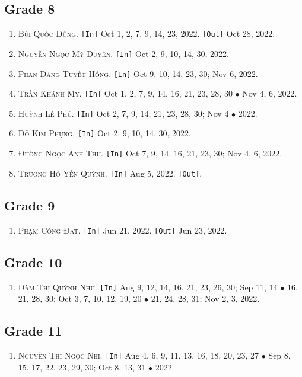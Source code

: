 \documentclass{article}
\numberwithin{equation}{section}
\begin{document}
\subsection{Grade 8}
\begin{enumerate}
	\item \textsc{Bùi Quốc Dũng.} \texttt{[In]} Oct 1, 2, 7, 9, 14, 23, 2022. \texttt{[Out]} Oct 28, 2022.
	\item \textsc{Nguyễn Ngọc Mỹ Duyên.} \texttt{[In]} Oct 2, 9, 10, 14, 30, 2022.
	\item \textsc{Phan Đặng Tuyết Hồng.} \texttt{[In]} Oct 9, 10, 14, 23, 30; Nov 6, 2022.
	\item \textsc{Trần Khánh My.} \texttt{[In]} Oct 1, 2, 7, 9, 14, 16, 21, 23, 28, 30 $\bullet$ Nov 4, 6, 2022.
	\item \textsc{Huỳnh Lê Phú.} \texttt{[In]} Oct 2, 7, 9, 14, 21, 23, 28, 30; Nov 4 $\bullet$ 2022.
	\item \textsc{Đỗ Kim Phụng.} \texttt{[In]} Oct 2, 9, 10, 14, 30, 2022.
	\item \textsc{Đường Ngọc Anh Thư.} \texttt{[In]} Oct 7, 9, 14, 16, 21, 23, 30; Nov 4, 6, 2022.
	\item \textsc{Trương Hồ Yến Quỳnh.} \texttt{[In]} Aug 5, 2022. \texttt{[Out]}.
\end{enumerate}

\subsection{Grade 9}
\begin{enumerate}
	\item \textsc{Phạm Công Đạt.} \texttt{[In]} Jun 21, 2022. \texttt{[Out]} Jun 23, 2022.
\end{enumerate}

\subsection{Grade 10}
\begin{enumerate}
	\item \textsc{Đàm Thị Quỳnh Như.} \texttt{[In]} Aug 9, 12, 14, 16, 21, 23, 26, 30; Sep 11, 14 $\bullet$ 16, 21, 28, 30; Oct 3, 7, 10, 12, 19, 20 $\bullet$ 21, 24, 28, 31; Nov 2, 3, 2022.
\end{enumerate}

\subsection{Grade 11}
\begin{enumerate}
	\item \textsc{Nguyễn Thị Ngọc Nhi.} \texttt{[In]} Aug 4, 6, 9, 11, 13, 16, 18, 20, 23, 27 $\bullet$ Sep 8, 15, 17, 22, 23, 29, 30; Oct 8, 13, 31 $\bullet$ 2022.
\end{enumerate}
\end{document}

